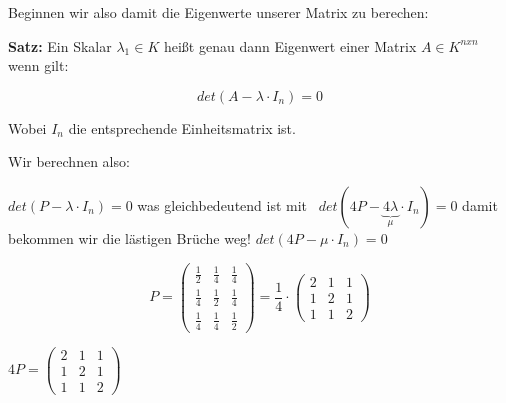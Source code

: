 \begin{uebsp}
\begin{Answer}
\bigskip

{
Beginnen wir also damit die Eigenwerte unserer Matrix zu berechen:}


\bigskip

{
\textbf{Satz: }Ein Skalar  $\lambda _{1}\in K$ hei{\ss}t genau dann
Eigenwert einer Matrix  $A\in K^{\mathit{nxn}}$ wenn gilt:}


\bigskip

\begin{equation*}
\mathit{det}(A-\lambda \cdot I_{n})=0
\end{equation*}

\bigskip

{
Wobei  $I_{n}$ die entsprechende Einheitsmatrix ist.}


\bigskip

{
Wir berechnen also: }


\bigskip

{
 $\mathit{det}(P-\lambda \cdot I_{n})=0$  was gleichbedeutend ist mit \ 
$\mathit{det}(4P-\underbrace{4\lambda }_{\mu }\cdot I_{n})=0$ damit
bekommen wir die l\"astigen Br\"uche weg!  $\mathit{det}(4P-\mu \cdot
I_{n})=0$ }


\bigskip





\begin{equation*}
P=\left(\begin{matrix}\frac{1}{2}&\frac{1}{4}&\frac{1}{4}\\\frac{1}{4}&\frac{1}{2}&\frac{1}{4}\\\frac{1}{4}&\frac{1}{4}&\frac{1}{2}\end{matrix}\right)=\frac{1}{4}\cdot
\left(\begin{matrix}2&1&1\\1&2&1\\1&1&2\end{matrix}\right)
\end{equation*}




 $4P=\left(\begin{matrix}2&1&1\\1&2&1\\1&1&2\end{matrix}\right)$




\end{Answer}
\end{uebsp}
